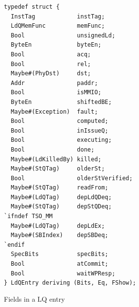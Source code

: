 \begin{figure}
\begin{lstlisting}[caption={}]
typedef struct {
  InstTag            instTag;
  LdQMemFunc         memFunc;
  Bool               unsignedLd;
  ByteEn             byteEn;
  Bool               acq;
  Bool               rel;
  Maybe#(PhyDst)     dst;
  Addr               paddr;
  Bool               isMMIO;
  ByteEn             shiftedBE;
  Maybe#(Exception)  fault;
  Bool               computed;
  Bool               inIssueQ;
  Bool               executing;
  Bool               done;
  Maybe#(LdKilledBy) killed;
  Maybe#(StQTag)     olderSt;
  Bool               olderStVerified;
  Maybe#(StQTag)     readFrom;
  Maybe#(LdQTag)     depLdQDeq;
  Maybe#(StQTag)     depStQDeq;
`ifndef TSO_MM
  Maybe#(LdQTag)     depLdEx;
  Maybe#(SBIndex)    depSBDeq;
`endif
  SpecBits           specBits;
  Bool               atCommit;
  Bool               waitWPResp;
} LdQEntry deriving (Bits, Eq, FShow);
\end{lstlisting}
\caption{Fields in a LQ entry}\label{fig:lq-entry}
\end{figure}


